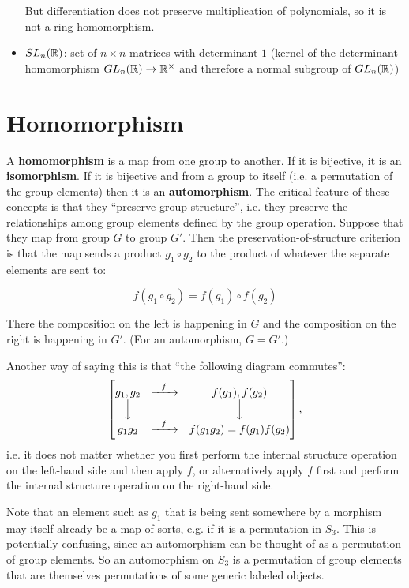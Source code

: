 \begin{itemize}
  But differentiation does not preserve multiplication of polynomials, so it is not a ring
  homomorphism.

\item $SL_n(\mathbb{R})$: set of $n \times n$ matrices with determinant $1$ (kernel of the
  determinant homomorphism $GL_n(\mathbb{R}) \rightarrow \mathbb{R}^\times$ and therefore a normal
  subgroup of $GL_n(\mathbb{R})$)
\end{itemize}


\newpage
\section{Homomorphism}

A \textbf{homomorphism} is a map from one group to another. If it is bijective,
it is an \textbf{isomorphism}. If it is bijective and from a group to itself
(i.e. a permutation of the group elements) then it is an
\textbf{automorphism}. The critical feature of these concepts is that they
``preserve group structure'', i.e. they preserve the relationships among group
elements defined by the group operation. Suppose that they map from group $G$
to group $G'$. Then the preservation-of-structure criterion is that the map
sends a product $g_1 \circ g_2$ to the product of whatever the separate
elements are sent to:

$$
f(g_1 \circ g_2) = f(g_1) \circ f(g_2)
$$

There the composition on the left is happening in $G$ and the composition on
the right is happening in $G'$. (For an automorphism, $G=G'$.)

Another way of saying this is that ``the following diagram commutes'':
\begin{align*}
  \begin{bmatrix}g_1, g_2 & \xrightarrow{~~f~~} & f(g_1), f(g_2)\\\Big\downarrow &  & \Big\downarrow\\g_1g_2 & \xrightarrow{~~f~~} & f(g_1g_2) = f(g_1)f(g_2)\\ \end{bmatrix},
\end{align*}
i.e. it does not matter whether you first perform the internal structure operation on the left-hand
side and then apply $f$, or alternatively apply $f$ first and perform the internal structure
operation on the right-hand side.

Note that an element such as $g_1$ that is being sent somewhere by a morphism
may itself already be a map of sorts, e.g. if it is a permutation in
$S_3$. This is potentially confusing, since an automorphism can be thought of
as a permutation of group elements. So an automorphism on $S_3$ is a
permutation of group elements that are themselves permutations of some generic
labeled objects.

